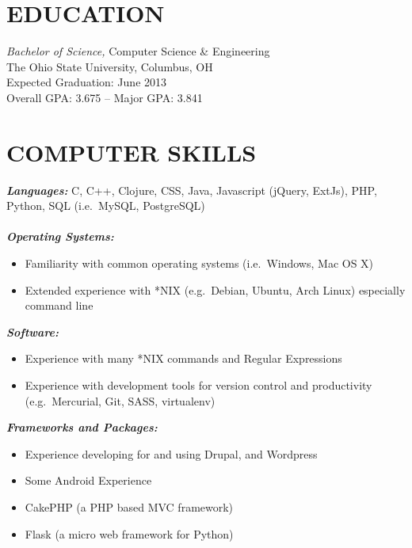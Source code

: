 \documentclass[line,margin=.2,letterpaper]{resume}
\begin{document}
\fancyhead{}
\fancyfoot{}
\renewcommand{\headrulewidth}{0pt}

\address{2092 Middlesex road, Columbus, OH 43220}
\address{\href{mailto:ryan@ryanmcg.com}{ryan@ryanmcg.com} -- (614) 678-4408 --
\href{https://github.com/RyanMcG}{RyanMcG on GitHub}}
\begin{resume}
    \vspace{-.45in}

    \section{\uppercase{Education}} {\sl Bachelor of Science,} \/Computer
    Science \& Engineering \\
    The Ohio State University, Columbus, OH \\
    Expected Graduation: June 2013 \\
    Overall GPA: 3.675 -- Major GPA: 3.841 \\
    \vspace{-.15in}

    \section{\uppercase{Computer Skills}}
    {\sl\textbf{Languages:}}
    \/C, C++, Clojure, CSS, Java, Javascript (jQuery, ExtJs), PHP, Python, SQL
    (i.e.~MySQL, PostgreSQL) \\ \\
    {\sl\textbf{Operating Systems: }} \hfill 
    \begin{itemize}
        \item Familiarity with common operating systems (i.e.~Windows, Mac OS X)
        \item Extended experience with *NIX (e.g.~Debian, Ubuntu, Arch Linux)
            especially command line
    \end{itemize}
    {\sl\textbf{Software:}} \hfill 
    \begin{itemize}
        \item Experience with many *NIX commands and Regular Expressions
        \item Experience with development tools for version control and
            productivity (e.g.~Mercurial, Git, SASS, virtualenv)
    \end{itemize}
    {\sl\textbf{Frameworks and Packages:}} \hfill 
    \begin{itemize}
        \item Experience developing for and using Drupal, and Wordpress
        \item Some Android Experience
        \item CakePHP (a PHP based MVC framework)
        \item Flask (a micro web framework for Python)
    \end{itemize}


\end{resume}
\end{document}
